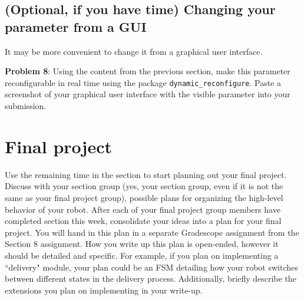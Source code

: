 \documentclass{article}
\begin{document}
\subsection{(Optional, if you have time) Changing your parameter from a GUI}
It may be more convenient to change it from a graphical user interface. 

\textbf{Problem 8}: Using the content from the previous section, make this parameter reconfigurable in real time using the package 
\texttt{dynamic\_reconfigure}. Paste a screenshot of your graphical user interface with the visible parameter into your submission.

\section{Final project}
Use the remaining time in the section to start planning out your final project. Discuss with your section group (yes, your section group, even if it is not the same as your final project group), possible plans for organizing the high-level behavior of your robot. 
After each of your final project group members have completed section this week, consolidate your ideas into a plan for your final project. You will hand in this plan in a separate Gradescope assignment from the Section 8 assignment. 
How you write up this plan is open-ended, however it should be detailed and specific. For example, if you plan on implementing a ``delivery" module, your plan could be an FSM detailing how your robot switches between different states in the delivery process.
Additionally, briefly describe the extensions you plan on implementing in your write-up.
\end{document}
